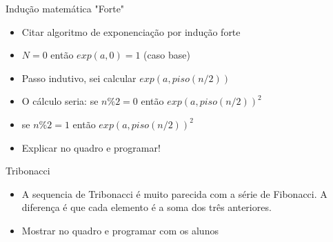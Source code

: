 \begin{frame}
	\begin{block}{Indução matemática "Forte"}
		\begin{itemize}
			\item Citar algoritmo de exponenciação por indução forte

			\item $N = 0$ então $exp(a,0) = 1$ (caso base)
			
			\item Passo indutivo, sei calcular $exp(a,piso(n/2))$
			
			\item O cálculo seria: se $n\%2 = 0$ então $exp(a,piso(n/2))^2$
			\item  se $n\% 2 = 1$ então $exp(a,piso(n/2))^2$
			
			\item Explicar no quadro e programar!
		\end{itemize}
	\end{block}
\end{frame}

\begin{frame}
	\begin{block}{Tribonacci}
		\begin{itemize}
			\item A sequencia de Tribonacci é muito parecida com a série de Fibonacci. A diferença é que cada elemento é a soma dos três anteriores.

			\item Mostrar no quadro e programar com os alunos
		\end{itemize}
	\end{block}
\end{frame}